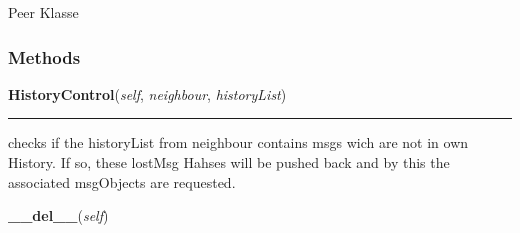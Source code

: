     \label{peer:Peer}
Peer Klasse



  \subsubsection{Methods}

    \label{peer:Peer:HistoryControl}

    \vspace{0.5ex}

\hspace{.8\funcindent}\begin{boxedminipage}{\funcwidth}

    \raggedright \textbf{HistoryControl}(\textit{self}, \textit{neighbour}, \textit{historyList})

    \vspace{-1.5ex}

    \rule{\textwidth}{0.5\fboxrule}
\setlength{\parskip}{2ex}
    checks if the historyList from neighbour contains msgs wich are not in 
    own History. If so, these lostMsg Hahses will be pushed back and by 
    this the associated msgObjects are requested.

\setlength{\parskip}{1ex}
    \end{boxedminipage}

    \label{peer:Peer:__del__}

    \vspace{0.5ex}

\hspace{.8\funcindent}\begin{boxedminipage}{\funcwidth}

    \raggedright \textbf{\_\_del\_\_}(\textit{self})

\setlength{\parskip}{2ex}
\setlength{\parskip}{1ex}
    \end{boxedminipage}

    \label{peer:Peer:__init__}

    \vspace{0.5ex}

